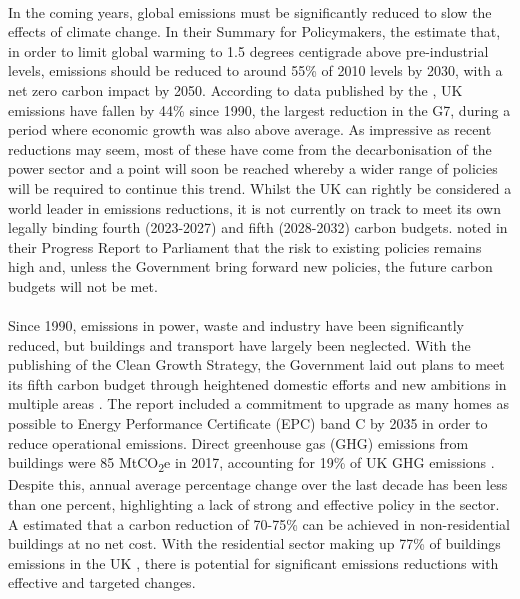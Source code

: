 \documentclass[12pt]{article}
\begin{document}
\paragraph{}
In the coming years, global emissions must be significantly reduced to slow the effects of climate change. In their Summary for Policymakers, the \citet{Intergovernmental_Panel_on_Climate_Change2018-hl} estimate that, in order to limit global warming to 1.5 degrees centigrade above pre-industrial levels, emissions should be reduced to around 55\% of 2010 levels by 2030, with a net zero carbon impact by 2050. According to data published by the \citet{Department_for_Business_Energy2019-kd}, UK emissions have fallen by 44\% since 1990, the largest reduction in the G7, during a period where economic growth was also above average. As impressive as recent reductions may seem, most of these have come from the decarbonisation of the power sector and a point will soon be reached whereby a wider range of policies will be required to continue this trend. Whilst the UK can rightly be considered a world leader in emissions reductions, it is not currently on track to meet its own legally binding fourth (2023-2027) and fifth (2028-2032) carbon budgets. \citet{Committee_on_Climate_Change2018-tf} noted in their Progress Report to Parliament that the risk to existing policies remains high and, unless the Government bring forward new policies, the future carbon budgets will not be met. 

\paragraph{}
Since 1990, emissions in power, waste and industry have been significantly reduced, but buildings and transport have largely been neglected. With the publishing of the Clean Growth Strategy, the Government laid out plans to meet its fifth carbon budget through heightened domestic efforts and new ambitions in multiple areas \citep{HM_Government2018-mj}. The report included a commitment to upgrade as many homes as possible to Energy Performance Certificate (EPC) band C by 2035 in order to reduce operational emissions. Direct greenhouse gas (GHG) emissions from buildings were 85 MtCO\textsubscript{2}e in 2017, accounting for 19\% of UK GHG emissions \citep{Committee_on_Climate_Change2018-tf}. Despite this, annual average percentage change over the last decade has been less than one percent, highlighting a lack of strong and effective policy in the sector. A \citet{A_UK-GBC_Task_Group_on_Display_Energy_Certificates_and_the_Carbon_Reduction_Commitment_Energy_Efficiency_Scheme2011-vj} estimated that a carbon reduction of 70-75\% can be achieved in non-residential buildings at no net cost. With the residential sector making up 77\% of buildings emissions in the UK \citep{Committee_on_Climate_Change2018-tf}, there is potential for significant emissions reductions with effective and targeted changes. 
\end{document}
